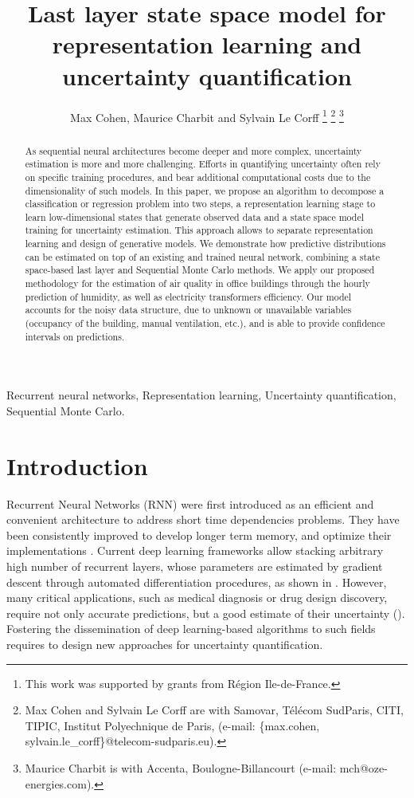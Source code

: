 \documentclass[journal]{IEEEtran}
\title{Last layer state space model for representation learning and uncertainty quantification}
\author{Max Cohen, Maurice Charbit and Sylvain Le Corff
	\thanks{This work was supported by grants from Région Ile-de-France.}
	\thanks{Max Cohen and Sylvain Le Corff are with Samovar, T\'el\'ecom SudParis, CITI, TIPIC, Institut Polyechnique de Paris, (e-mail: \{max.cohen, sylvain.le\_corff\}@telecom-sudparis.eu).}
	\thanks{Maurice Charbit is with Accenta, Boulogne-Billancourt (e-mail: mch@oze-energies.com).}}
\begin{document}
\maketitle
\begin{abstract}
	As sequential neural architectures become deeper and more complex, uncertainty estimation is more and more challenging.
	Efforts in quantifying uncertainty often rely on specific training procedures, and bear additional computational costs due to the dimensionality of such models. In this paper, we propose an algorithm to decompose a classification or regression problem into two steps,  a representation learning stage to learn low-dimensional states that generate observed data and a state space model training for uncertainty estimation. This approach allows to separate representation learning and design of generative models. We demonstrate how predictive distributions can be estimated on top of an existing and trained neural network, combining a state space-based last layer and Sequential Monte Carlo methods.  We apply our proposed methodology for the estimation of air quality in office buildings through the hourly prediction of humidity, as well as electricity transformers efficiency.
	Our model accounts for the noisy data structure, due to unknown or unavailable variables (occupancy of the building, manual ventilation, etc.), and is able to provide confidence intervals on predictions.
\end{abstract}

\begin{IEEEkeywords}
	Recurrent neural networks, Representation learning, Uncertainty quantification, Sequential Monte Carlo.
\end{IEEEkeywords}

\section{Introduction}
\label{sec:intro}

Recurrent Neural Networks (RNN) were first introduced as an efficient and convenient architecture to address short time dependencies problems.
They have been consistently improved to develop longer term memory, and optimize their implementations \cite{Bengio1994LearningLD,Hochreiter1997LongSM}. %
Current deep learning frameworks allow stacking arbitrary high number of recurrent layers, whose parameters are estimated by gradient descent through automated differentiation procedures, as shown in \cite{Graves2013SpeechRecognition}.
However, many critical applications, such as medical diagnosis or drug design discovery, require not only accurate predictions, but a good estimate of their uncertainty (\cite{Crowson2016AssessingCalibration, Mervin2020UncertaintyQuantification}).
Fostering the dissemination of deep learning-based algorithms to such fields requires to design new approaches for uncertainty quantification.
\end{document}
